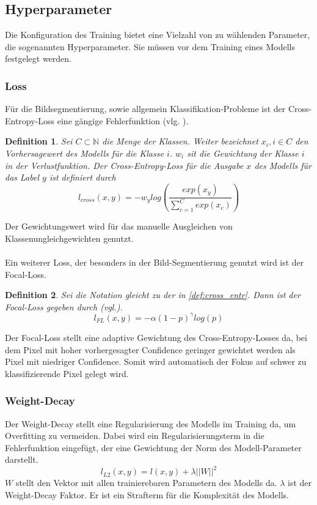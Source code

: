 \documentclass[12pt,DIV=15,BCOR=15mm,twoside,headsepline,abstract=true,listof=totoc,bibliography=totoc]{scrreprt}
\newtheorem{defi}{Definition}
\theoremstyle{remark}    %
\begin{document}
    \subsection{Hyperparameter}
    Die Konfiguration des Training bietet eine Vielzahl von zu wählenden Parameter, die sogenannten Hyperparameter. Sie müssen vor dem Training eines 
    Modells festgelegt werden.
    \subsubsection{Loss}
    Für die Bildsegmentierung, sowie allgemein Klassifikation-Probleme ist der Cross-Entropy-Loss eine gängige Fehlerfunktion 
    (vlg. \cite{chen2017rethinkingatrousconvolutionsemantic,csurka2023semanticimagesegmentationdecades}).
    \begin{defi}
    Sei $C \subset \mathbb{N}$ die Menge der Klassen. Weiter bezeichnet $x_i, i \in C$ den Vorhersagewert des Modells für die Klasse $i$.
    $w_i$ sit die Gewichtung der Klasse $i$ in der Verlustfunktion. Der Cross-Entropy-Loss für die Ausgabe $x$ des Modells für das Label $y$ ist definiert 
    durch
    \begin{equation}\label{def:cross_entr}
        l_{cross}(x,y) = -w_{y} log\left(\frac{exp(x_{y})}{\sum_{c=1}^{C}exp(x_{c})}\right)
    \end{equation}
    \end{defi}\noindent
    Der Gewichtungswert wird für das manuelle Ausgleichen von Klassenungleichgewichten genutzt. \\\\
    Ein weiterer Loss, der besonders in der Bild-Segmentierung genutzt wird ist der Focal-Loss.
    \begin{defi}
    Sei die Notation gleicht zu der in \ref{def:cross_entr}. Dann ist der Focal-Loss gegeben durch (vgl.\cite{lin2018focallossdenseobject}). 
    \begin{equation}
        l_{FL}(x,y) = -\alpha (1-p)^{\gamma}log (p)
    \end{equation} 
    \end{defi}\noindent
    Der Focal-Loss stellt eine adaptive Gewichtung des Cross-Entropy-Losses da, bei dem Pixel mit hoher vorhergesagter Confidence geringer gewichtet 
    werden als Pixel mit niedriger Confidence. Somit wird automatisch der Fokus auf schwer zu klassifizierende Pixel gelegt wird.
    \subsubsection{Weight-Decay}
    Der Weight-Decay stellt eine Regularisierung des Modells im Training da, um Overfitting zu vermeiden. Dabei wird ein Regularisierungsterm in die
    Fehlerfunktion eingefügt, der eine Gewichtung der Norm des Modell-Parameter darstellt.  
    \begin{equation}
        l_{L2}(x,y) = l(x,y) + \lambda ||W||^2
    \end{equation}
    $W$ stellt den Vektor mit allen trainierebaren Parametern des Modells da. $\lambda$ ist der Weight-Decay Faktor. 
    Er ist ein Strafterm für die Komplexität des Modells.
\end{document}
